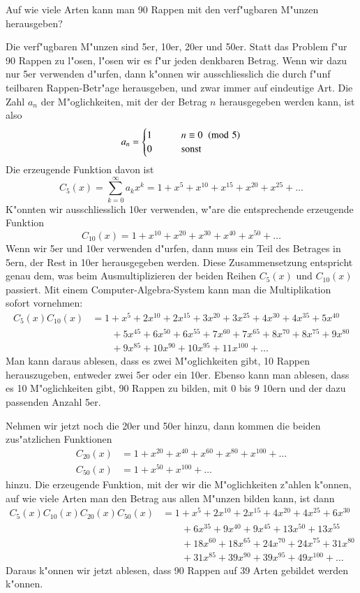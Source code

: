 \begin{beispiele}
\item 
Auf wie viele Arten kann man 90 Rappen mit den verf"ugbaren M"unzen
herausgeben?

Die verf"ugbaren M"unzen sind 5er, 10er, 20er und 50er.
Statt das Problem f"ur 90 Rappen zu l"osen, l"osen wir es f"ur jeden
denkbaren Betrag.
Wenn wir dazu nur 5er verwenden d"urfen, dann k"onnen wir ausschliesslich
die durch f"unf teilbaren Rappen-Betr"age herausgeben, und zwar immer
auf eindeutige Art.
Die Zahl $a_n$ der M"oglichkeiten, mit der der Betrag
$n$ herausgegeben werden kann, ist also
\[
a_n = \begin{cases}
1&\qquad n\equiv 0\imod{5}\\
0&\qquad \text{sonst}
\end{cases}
\]
Die erzeugende Funktion davon ist
\[
C_5(x)=\sum_{k=0}^\infty a_kx^k=1+x^5+x^{10}+x^{15}+x^{20}+x^{25}+\dots
\]
K"onnten wir ausschliesslich 10er verwenden, w"are die entsprechende
erzeugende Funktion
\[
C_{10}(x)=1+x^{10}+x^{20}+x^{30}+x^{40}+x^{50}+\dots
\]
Wenn wir 5er und 10er verwenden d"urfen, dann muss ein Teil des Betrages
in 5ern, der Rest in 10er herausgegeben werden.
Diese Zusammensetzung entspricht genau dem, was beim Ausmultiplizieren
der beiden Reihen $C_5(x)$ und $C_{10}(x)$ passiert.
Mit einem Computer-Algebra-System kann man die Multiplikation sofort vornehmen:
\begin{align*}
C_5(x)C_{10}(x)&=
 1+x^5+2 x^{10}+2 x^{15}+3 x^{20}+3 x^{25}+4 x^{30}+4 x^{35}+5 x^{40}\\
&\qquad +5 x^{45} +6 x^{50}+6 x^{55}+7 x^{60}+7 x^{65}+8 x^{70}+8 x^{75}+9 x^{80}\\
&\qquad +9 x^{85}+10 x^{90}+10 x^{95}+11 x^{100}+\dots
\end{align*}
Man kann daraus ablesen, dass es zwei M"oglichkeiten gibt, 10 Rappen
herauszugeben, entweder zwei 5er oder ein 10er.
Ebenso kann man ablesen,
dass es 10 M"oglichkeiten gibt, 90 Rappen zu bilden, mit 0 bis 9 10ern
und der dazu passenden Anzahl 5er.

Nehmen wir jetzt noch die 20er und 50er hinzu, dann kommen die beiden
zus"atzlichen Funktionen
\begin{align*}
C_{20}(x)&= 1+x^{20}+x^{40}+x^{60}+x^{80}+x^{100}+\dots\\
C_{50}(x)&=1+x^{50}+x^{100}+\dots
\end{align*}
hinzu.
Die erzeugende Funktion, mit der wir die M"oglichkeiten z"ahlen
k"onnen, auf wie viele Arten man den Betrag aus allen M"unzen bilden kann,
ist dann
\begin{align*}
C_5(x) C_{10}(x) C_{20}(x) C_{50}(x)
&=
1+x^5+2 x^{10}+2 x^{15}+4 x^{20}+4 x^{25}+6 x^{30}\\
&\qquad
+6 x^{35} +9 x^{40} +9 x^{45}+13 x^{50}+13 x^{55}\\
&\qquad
+18 x^{60}+18 x^{65} +24 x^{70}+24 x^{75}+31 x^{80}\\
&\qquad
+31 x^{85}+39 x^{90}+39 x^{95} +49 x^{100}+\dots
\end{align*}
Daraus k"onnen wir jetzt ablesen, dass 90 Rappen auf 39 Arten
gebildet werden k"onnen.
\end{beispiele}

